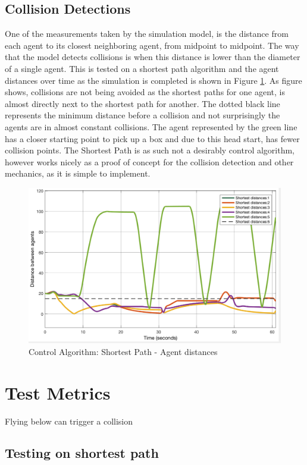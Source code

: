 \subsection{Collision Detections}
One of the measurements taken by the simulation model, is the distance from each agent to its closest neighboring agent, from midpoint to midpoint. The way that the model detects collisions is when this distance is lower than the diameter of a single agent. This is tested on a shortest path algorithm and the agent distances over time as the simulation is completed is shown in Figure \ref{fig:short_dist}. As figure shows, collisions are not being avoided as the shortest paths for one agent, is almost directly next to the shortest path for another. The dotted black line represents the minimum distance before a collision and not surprisingly the agents are in almost constant collisions. The agent represented by the green line has a closer starting point to pick up a box and due to this head start, has fewer collision points. The Shortest Path is as such not a desirably control algorithm, however works nicely as a proof of concept for the collision detection and other mechanics, as it is simple to implement. 

\begin{figure}[H]
  \centering
  \includegraphics[width=0.8\columnwidth]{figures/MA_agent_overlap}
  \caption{\label{fig:short_dist}Control Algorithm: Shortest Path - Agent distances}
\end{figure}

\section{Test Metrics}
\label{sec:test_metrics}


Flying below can trigger a collision
\subsection{Testing on shortest path}



